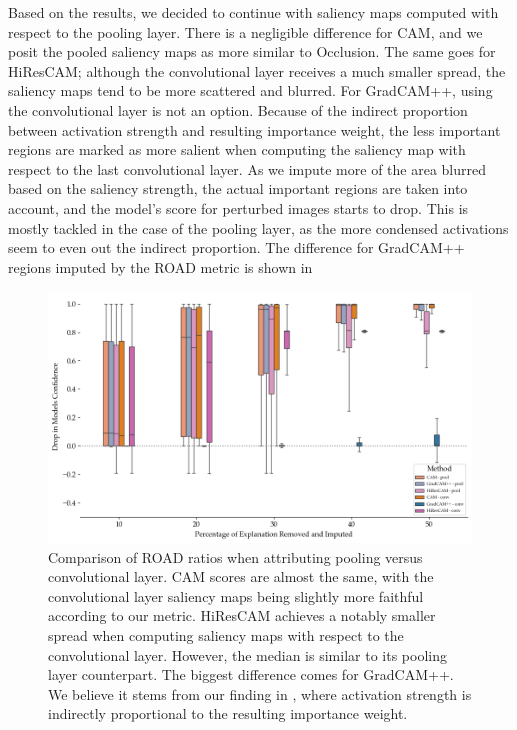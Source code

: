 Based on the results, we decided to continue with saliency maps computed with respect to the pooling layer.
There is a negligible difference for CAM, and we posit the pooled saliency maps as more similar to Occlusion.
The same goes for HiResCAM; although the convolutional layer receives a much smaller spread, the saliency maps tend to be more scattered and blurred.
For GradCAM++, using the convolutional layer is not an option.
Because of the indirect proportion between activation strength and resulting importance weight, the less important regions are marked as more salient when computing the saliency map with respect to the last convolutional layer.
As we impute more of the area blurred based on the saliency strength, the actual important regions are taken into account, and the model's score for perturbed images starts to drop.
This is mostly tackled in the case of the pooling layer, as the more condensed activations seem to even out the indirect proportion. 
The difference for GradCAM++ regions imputed by the ROAD metric is shown in 

\begin{figure}
    \begin{center}
    \begin{minipage}{1\textwidth}
      \includegraphics[width=\textwidth]{img/road-conv-vs-pool.png}
    \end{minipage}
    \caption{Comparison of ROAD ratios when attributing pooling versus convolutional layer. CAM scores are almost the same, with the convolutional layer saliency maps being slightly more faithful according to our metric. HiResCAM achieves a notably smaller spread when computing saliency maps with respect to the convolutional layer. However, the median is similar to its pooling layer counterpart. The biggest difference comes for GradCAM++. We believe it stems from our finding in , where activation strength is indirectly proportional to the resulting importance weight.}
    \label{fig:road-conv-vs-pool}
    \end{center}
\end{figure}

